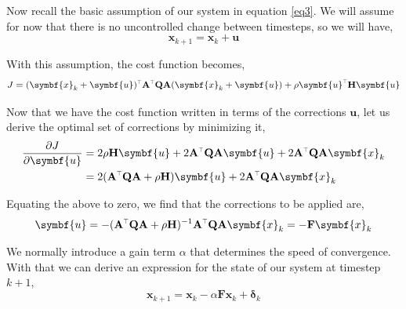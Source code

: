 \documentclass[SE,authoryear,toc]{lsstdoc}
\renewcommand{\v}[1]{\mathbf{#1}}
\newcommand{\tr}{\scalebox{0.6}{$\top$}}
\begin{document}
Now recall the basic assumption of our system in equation \ref{eq3}. We will assume for now that there is no uncontrolled change between timesteps, so we will have, 
\begin{equation}
    \symbf{x}_{k+1} = \symbf{x}_k + \symbf{u}
\end{equation}

With this assumption, the cost function becomes, 
\begin{equation}
     J = (\symbf{x}_{k} + \symbf{u})^{\tr}\v{A}^{\tr}\v{Q}\v{A}(\symbf{x}_{k} + \symbf{u}) + \rho \symbf{u}^{\tr}\v{H}\symbf{u}
\end{equation}

Now that we have the cost function written in terms of the corrections $\symbf{u}$, let us derive the optimal set of corrections by minimizing it, 
\begin{equation}
\begin{split}
    \frac{\partial J}{\partial \symbf{u}} & = 2\rho \v{H} \symbf{u} + 2 \v{A}^{\tr}\v{Q}\v{A} \symbf{u} + 2\v{A}^{\tr}\v{Q}\v{A} \symbf{x}_k \\
    & = 2( \v{A}^{\tr}\v{Q}\v{A} + \rho \v{H})\symbf{u} + 2 \v{A}^{\tr}\v{Q}\v{A} \symbf{x}_k
\end{split}
\end{equation}

Equating the above to zero, we find that the corrections to be applied are, 
\begin{equation}
    \symbf{u} = -(\v{A}^{\tr}\v{Q}\v{A} + \rho \v{H})^{-1}\v{A}^{\tr}\v{Q}\v{A}\symbf{x}_k = -\v{F}\symbf{x}_k
\end{equation}

We normally introduce a gain term $\alpha$ that determines the speed of convergence. With that we can derive an expression for the state of our system at timestep $k+1$,
\begin{equation}\label{eq4}
    \symbf{x}_{k + 1} = \symbf{x}_{k} - \alpha\v{F}\symbf{x}_k + \symbf{\delta}_{k}
\end{equation}
\end{document}
